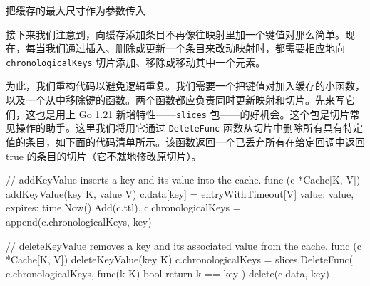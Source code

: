 
\begin{codeannotations}
\item 把缓存的最大尺寸作为参数传入
\end{codeannotations}

接下来我们注意到，向缓存添加条目不再像往映射里加一个键值对那么简单。现在，每当我们通过插入、删除或更新一个条目来改动映射时，都需要相应地向 \texttt{chronologicalKeys} 切片添加、移除或移动其中一个元素。

为此，我们重构代码以避免逻辑重复。我们需要一个把键值对加入缓存的小函数，以及一个从中移除键的函数。两个函数都应负责同时更新映射和切片。先来写它们，这也是用上 Go 1.21 新增特性——\texttt{slices} 包——的好机会。这个包是切片常见操作的助手。这里我们将用它通过 \texttt{DeleteFunc} 函数从切片中删除所有具有特定值的条目，如下面的代码清单所示。该函数返回一个已丢弃所有在给定回调中返回 true 的条目的切片（它不就地修改原切片）。

\begin{gocode}[title={代码清单 7.17 \texttt{cache.go}：取代映射调用的辅助函数}]
// addKeyValue inserts a key and its value into the cache.
func (c *Cache[K, V]) addKeyValue(key K, value V) {
    c.data[key] = entryWithTimeout[V]{
        value:   value,
        expires: time.Now().Add(c.ttl),
    }
    c.chronologicalKeys = append(c.chronologicalKeys, key)
}

// deleteKeyValue removes a key and its associated value from the cache.
func (c *Cache[K, V]) deleteKeyValue(key K) {
    c.chronologicalKeys = slices.DeleteFunc(
        c.chronologicalKeys,
        func(k K) bool { return k == key })
    delete(c.data, key)
}
\end{gocode}


